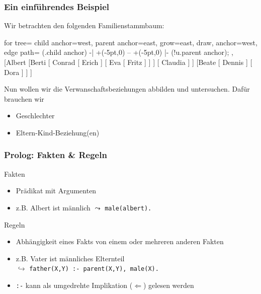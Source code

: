 \documentclass{beamer}
\begin{document}
\begin{frame} \frametitle{Ein einführendes Beispiel}
	Wir betrachten den folgenden Familienstammbaum:
	
	\begin{center}
		\begin{forest}
			for tree={
				child anchor=west,
				parent anchor=east,
				grow=east,
				draw,
				anchor=west,
				edge path={
					\noexpand{}
					(.child anchor) -| +(-5pt,0) -- +(-5pt,0) |-
					(!u.parent anchor);
				},
			}
			[Albert
			[Berti
			[ Conrad 
			[ Erich ]
			[ Eva 
			[ Fritz ]
			]
			]
			[ Claudia ]
			]
			[Beate
			[ Dennis ]
			[ Dora ]
			]
			]
		\end{forest}
	\end{center}

	Nun wollen wir die Verwanschaftsbeziehungen abbilden und untersuchen. Dafür brauchen wir
	\begin{itemize}
		\item Geschlechter
		\item Eltern-Kind-Beziehung(en)
	\end{itemize}
\end{frame}

\begin{frame} \frametitle{Prolog: Fakten \& Regeln}
	\small
	\begin{block}{Fakten} 
		\begin{itemize}
			\item Prädikat mit Argumenten
			\item z.B. Albert ist männlich $\leadsto$ \texttt{male(albert).}
		\end{itemize}
	\end{block}
	\begin{block}{Regeln}
		\begin{itemize}
			\item Abhängigkeit eines Fakts von einem oder mehreren anderen Fakten
			\item z.B. Vater ist männliches Elternteil \\
			$\hookrightarrow$ \texttt{father(X,Y) :- parent(X,Y), male(X).} 
			\item \texttt{:-} kann als umgedrehte Implikation ($\Leftarrow$) gelesen werden
		\end{itemize}
	\end{block}
\end{frame}
\end{document}

